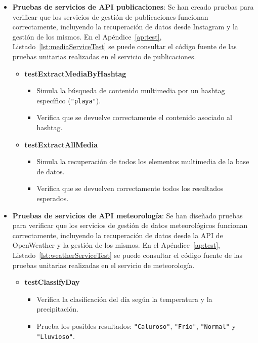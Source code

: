 \begin{itemize}
    \item \textbf{Pruebas de servicios de API publicaciones}: Se han creado pruebas para verificar que los servicios de gestión de publicaciones funcionan correctamente, incluyendo la recuperación de datos desde Instagram y la gestión de los mismos. En el Apéndice~\ref{ap:test}, Listado~\ref{lst:mediaServiceTest} se puede consultar el código fuente de las pruebas unitarias realizadas en el servicio de publicaciones.
    \begin{itemize}
  \item \textbf{testExtractMediaByHashtag}
  \begin{itemize}
    \item Simula la búsqueda de contenido multimedia por un hashtag específico (\texttt{"playa"}).
    \item Verifica que se devuelve correctamente el contenido asociado al hashtag.
  \end{itemize}

  \item \textbf{testExtractAllMedia}
  \begin{itemize}
    \item Simula la recuperación de todos los elementos multimedia de la base de datos.
    \item Verifica que se devuelven correctamente todos los resultados esperados.
  \end{itemize}
\end{itemize}

    \item \textbf{Pruebas de servicios de API meteorología}: Se han diseñado pruebas para verificar que los servicios de gestión de datos meteorológicos funcionan correctamente, incluyendo la recuperación de datos desde la API de OpenWeather y la gestión de los mismos. En el Apéndice~\ref{ap:test}, Listado~\ref{lst:weatherServiceTest} se puede consultar el código fuente de las pruebas unitarias realizadas en el servicio de meteorología.
    \begin{itemize}
  \item \textbf{testClassifyDay}
  \begin{itemize}
    \item Verifica la clasificación del día según la temperatura y la precipitación.
    \item Prueba los posibles resultados: \texttt{"Caluroso"}, \texttt{"Frío"}, \texttt{"Normal"} y \texttt{"Lluvioso"}.
  \end{itemize}


\end{itemize}
\end{itemize}

